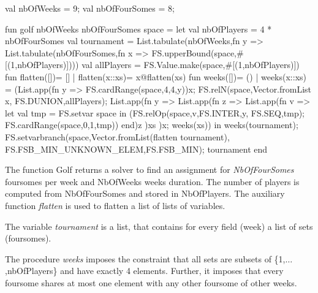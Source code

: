 \documentclass[a4paper,halfparskip]{scrartcl}
\begin{document}
\begin{myverbatim}
val nbOfWeeks = 9;
val nbOfFourSomes = 8;

fun golf nbOfWeeks nbOfFourSomes space =
  let
      val nbOfPlayers = 4 * nbOfFourSomes
      val tournament = List.tabulate(nbOfWeeks,fn y => 
                       List.tabulate(nbOfFourSomes,fn x =>
                       FS.upperBound(space,#[(1,nbOfPlayers)])))
      val allPlayers = FS.Value.make(space,#[(1,nbOfPlayers)])
      fun flatten([])= []
        | flatten(x::xs)= x@flatten(xs)
      fun weeks([])= ()
        | weeks(x::xs) = (List.app(fn y => 
                            FS.cardRange(space,4,4,y))x;
                          FS.relN(space,Vector.fromList x,
                                      FS.DUNION,allPlayers);
                          List.app(fn y =>
                           List.app(fn z => 
                            List.app(fn v =>
                             let
                                val tmp = FS.setvar space
                             in
                               (FS.relOp(space,v,FS.INTER,y,
                                            FS.SEQ,tmp);
                                FS.cardRange(space,0,1,tmp))
                             end)z   
                              )xs             
                            )x;
                           weeks(xs))
   in 
      weeks(tournament);
      FS.setvarbranch(space,Vector.fromList(flatten tournament),
                           FS.FSB_MIN_UNKNOWN_ELEM,FS.FSB_MIN);
      tournament
   end
        
\end{myverbatim}

The function Golf returns a solver to find an assignment 
for \emph{NbOfFourSomes} foursomes per week and NbOfWeeks weeks 
duration. The number of players is computed from NbOfFourSomes 
and stored in NbOfPlayers. The auxiliary function \emph{flatten} is 
used to flatten a list of lists of variables.

The variable \emph{tournament} is a list, that contains for
every field (week) a list of sets (foursomes).

The procedure \emph{weeks} imposes the constraint that
all sets are subsets of \{1,$\ldots$,nbOfPlayers\} 
and have exactly 4 elements. Further, it imposes 
that every foursome shares at most one element with any 
other foursome of other weeks.
\end{document}
